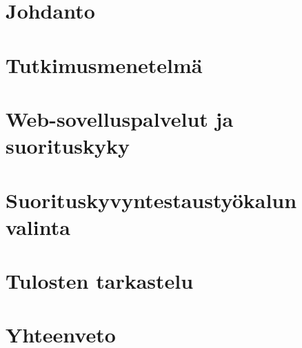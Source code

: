 
\glsaddall
{}
\setlength{\glsnamewidth}{0.25\textwidth}
\setlength{\glsdescwidth}{0.75\textwidth}
\renewcommand*{\glsgroupskip}{}

\printglossary[title={Lyhenteet ja merkinnät}]



\mainmatter

\chapter{Johdanto}
\label{ch:johdanto}


\chapter{Tutkimusmenetelmä}
\label{ch:tutkimusmenetelmä}


\chapter{Web-sovelluspalvelut ja suorituskyky}
\label{ch:taustaselvitys}


\chapter{Suorituskyvyntestaustyökalun valinta}
\label{ch:työkalunvalinta}


\chapter{Tulosten tarkastelu}
\label{ch:tulostentarkastelu}


\chapter{Yhteenveto}
\label{ch:yhteenveto}



